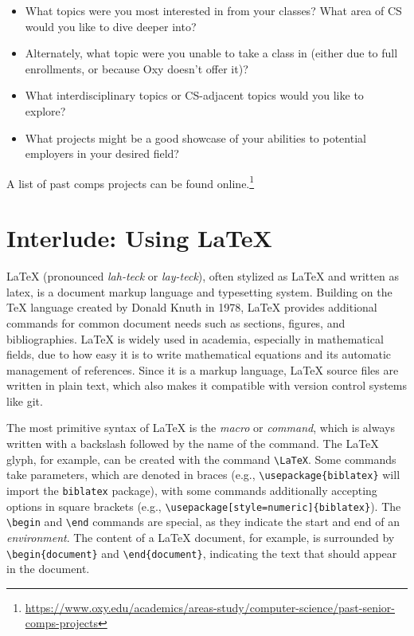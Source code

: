 \documentclass[10pt,twocolumn]{article}
\begin{document}
\begin{itemize}
    \item What topics were you most interested in from your classes? What area of CS would you like to dive deeper into?
    \item Alternately, what topic were you unable to take a class in (either due to full enrollments, or because Oxy doesn't offer it)?
    \item What interdisciplinary topics or CS-adjacent topics would you like to explore?
    \item What projects might be a good showcase of your abilities to potential employers in your desired field?
\end{itemize}

A list of past comps projects can be found online.\footnote{\url{https://www.oxy.edu/academics/areas-study/computer-science/past-senior-comps-projects}}

\section{Interlude: Using \LaTeX}

LaTeX (pronounced \textit{lah-teck} or \textit{lay-teck}), often stylized as {\LaTeX} and written as latex, is a document markup language and typesetting system.
Building on the {\TeX} language created by Donald Knuth in 1978, LaTeX provides additional commands for common document needs such as sections, figures, and bibliographies.
LaTeX is widely used in academia, especially in mathematical fields, due to how easy it is to write mathematical equations and its automatic management of references.
Since it is a markup language, LaTeX source files are written in plain text, which also makes it compatible with version control systems like git.

The most primitive syntax of LaTeX is the \textit{macro} or \textit{command}, which is always written with a backslash followed by the name of the command.
The {\LaTeX} glyph, for example, can be created with the command \texttt{\textbackslash LaTeX}.
Some commands take parameters, which are denoted in braces (e.g., \texttt{\textbackslash usepackage\{biblatex\}} will import the \texttt{biblatex} package), with some commands additionally accepting options in square brackets (e.g., \texttt{\textbackslash usepackage[style=numeric]\{biblatex\}}).
The \texttt{\textbackslash begin} and \texttt{\textbackslash end} commands are special, as they indicate the start and end of an \textit{environment}.
The content of a LaTeX document, for example, is surrounded by \texttt{\textbackslash begin\{document\}} and \texttt{\textbackslash end\{document\}}, indicating the text that should appear in the document.
\end{document}
